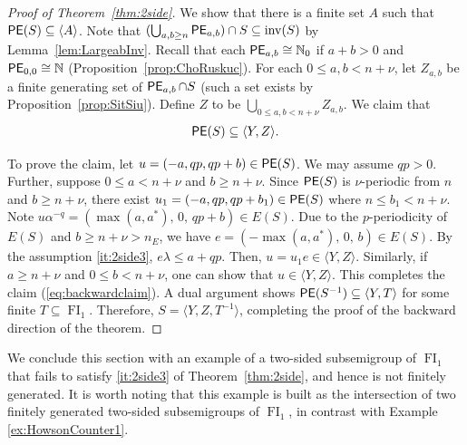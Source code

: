 \documentclass[reqno]{amsart}
\theoremstyle{plain}
\theoremstyle{definition}
\DeclareMathOperator{\inv}{inv}
\DeclareMathOperator{\FI}{FI}
\DeclareMathOperator{\PE}{\textup{\textsf{PE}}}
\numberwithin{equation}{section}
\begin{document}
\begin{proof}[Proof of Theorem~\ref{thm:2side}]
We show that there is a finite set $A$ such that $\PE(S)\subseteq \langle A\rangle$. Note that $(\bigcup_{a,b\geq n}\PE_{a,b})\cap S \subseteq \inv(S)$ by Lemma~\ref{lem:LargeabInv}. Recall that each $\PE_{a,b}\cong\mathbb{N}_0$ if $a+b>0$ and $\PE_{0,0}\cong\mathbb{N}$ (Proposition~\ref{prop:ChoRuskuc}). For each $0\leq a, b< n+\nu$, let $Z_{a,b}$ be a finite generating set of $\PE_{a,b}\cap S$ (such a set exists by Proposition~\ref{prop:SitSiu}). Define $Z$ to be $\bigcup_{0\leq a,b<n+\nu}Z_{a,b}$. We claim that
\begin{align}
    \PE(S)\subseteq \langle Y, Z\rangle. \label{eq:backwardclaim}
\end{align}

To prove the claim, let $u = (-a, qp, qp+b) \in \PE(S)$. We may assume $qp>0$. Further, suppose $0\leq a< n+\nu$ and $b\geq n+\nu$. Since $\PE(S)$ is $\nu$-periodic from $n$ and $b\geq n+\nu$, there exist $u_1 = (-a, qp, qp+b_1)\in \PE(S)$ where $n\leq b_1 <n+\nu$. Note $u\alpha^{-q} = (\max(a, a^\ast), \, 0,\, qp+b)\in E(S)$. Due to the $p$-periodicity of $E(S)$ and $b\geq n+\nu > n_E$, we have $e = (-\max(a, a^\ast),\,0,\, b)\in E(S)$. By the assumption \ref{it:2side3}, $e\lambda \leq a+qp$. Then, $u = u_1e\in\langle Y, Z\rangle$. Similarly, if $a\geq n+\nu$ and $0\leq b<n+\nu$, one can show that $u\in\langle Y,Z\rangle$. This completes the claim (\ref{eq:backwardclaim}). A dual argument shows $\PE(S^{-1})\subseteq \langle Y, T\rangle$ for some finite $T\subseteq \FI_1$. Therefore, $S = \langle Y, Z, T^{-1}\rangle$, completing the proof of the backward direction of the theorem.
\end{proof}

We conclude this section with an example of a two-sided subsemigroup of $\FI_1$ that fails to satisfy \ref{it:2side3} of Theorem~\ref{thm:2side}, and hence is not finitely generated. 
It is worth noting that this example is built as the intersection of two finitely generated two-sided subsemigroups of $\FI_1$, in contrast
with Example \ref{ex:HowsonCounter1}.
\end{document}
